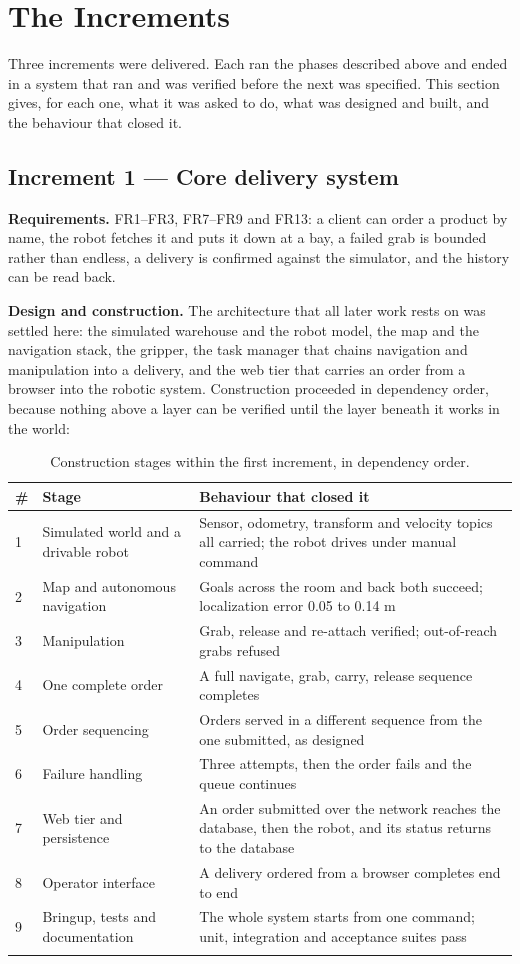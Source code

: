\documentclass[12pt,a4paper]{report}
\begin{document}
\section{The Increments}
\label{sec:increments}
Three increments were delivered. Each ran the phases described above and ended in a system that
ran and was verified before the next was specified. This section gives, for each one, what it was
asked to do, what was designed and built, and the behaviour that closed it.

\subsection{Increment 1 --- Core delivery system}
\textbf{Requirements.} FR1--FR3, FR7--FR9 and FR13: a client can order a product by name, the robot
fetches it and puts it down at a bay, a failed grab is bounded rather than endless, a delivery is
confirmed against the simulator, and the history can be read back.

\textbf{Design and construction.} The architecture that all later work rests on was settled here:
the simulated warehouse and the robot model, the map and the navigation stack, the gripper, the
task manager that chains navigation and manipulation into a delivery, and the web tier that carries
an order from a browser into the robotic system. Construction proceeded in dependency order,
because nothing above a layer can be verified until the layer beneath it works in the world:

\begin{longtable}{@{}p{}p{}p{}@{}}
\toprule
\textbf{\#} & \textbf{Stage} & \textbf{Behaviour that closed it} \\
\midrule
\endhead
1 & Simulated world and a drivable robot & Sensor, odometry, transform and velocity topics all
carried; the robot drives under manual command \\
2 & Map and autonomous navigation & Goals across the room and back both succeed; localization error
0.05 to 0.14 m \\
3 & Manipulation & Grab, release and re-attach verified; out-of-reach grabs refused \\
4 & One complete order & A full navigate, grab, carry, release sequence completes \\
5 & Order sequencing & Orders served in a different sequence from the one submitted, as designed \\
6 & Failure handling & Three attempts, then the order fails and the queue continues \\
7 & Web tier and persistence & An order submitted over the network reaches the database, then the
robot, and its status returns to the database \\
8 & Operator interface & A delivery ordered from a browser completes end to end \\
9 & Bringup, tests and documentation & The whole system starts from one command; unit, integration
and acceptance suites pass \\
\bottomrule
\caption{Construction stages within the first increment, in dependency order.}
\label{tab:increment1}
\end{longtable}
\end{document}
